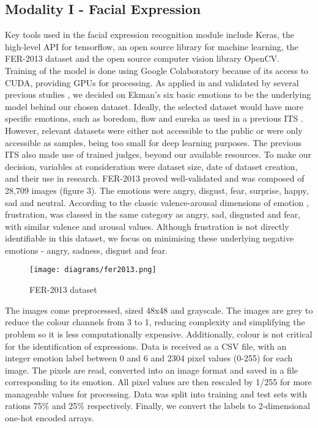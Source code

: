 \documentclass[12pt,a4paper]{article}
\begin{document}
\subsection{Modality I - Facial Expression}
Key tools used in the facial expression recognition module include Keras, the high-level API for tensorflow, an open source library for machine learning, the FER-2013 dataset \cite{giannopoulos2018deep} and the open source computer vision library OpenCV. Training of the model is done using Google Colaboratory because of its access to CUDA, providing GPUs for processing.
As applied in and validated by several previous studies \cite{graesser2005autotutor} \cite{woolf2009affect}, we decided on Ekman's six basic emotions \cite{ekman1992argument} to be the underlying model behind our chosen dataset. Ideally, the selected dataset would have more specific emotions, such as boredom, flow and eureka as used in a previous ITS \cite{barron2012intelligent}. However, relevant datasets were either not accessible to the public or were only accessible as samples, being too small for deep learning purposes. The previous ITS also made use of trained judges, beyond our available resources. To make our decision, variables at consideration were dataset size, date of dataset creation, and their use in research. FER-2013 proved well-validated \cite{giannopoulos2018deep} and was composed of 28,709 images (figure 3). The emotions were angry, disgust, fear, surprise, happy, sad and neutral.  According to the classic valence-arousal dimensions of emotion \cite{hepach2011conceptualizing}, frustration, was classed in the same category as angry, sad, disgusted and fear, with similar valence and arousal values. Although frustration is not directly identifiable in this dataset, we focus on minimising these underlying negative emotions -  angry, sadness, disgust and fear.

\begin{figure}[h]
	\centerline{\texttt{[image: diagrams/fer2013.png]}}
	\caption{FER-2013 dataset}
\end{figure}

The images come preprocessed, sized 48x48 and grayscale. The images are grey to reduce the colour channels from 3 to 1, reducing complexity and simplifying the problem so it is less computationally expensive. Additionally, colour is not critical for the identification of expressions. Data is received as a CSV file, with an integer emotion label between 0 and 6 and 2304 pixel values (0-255) for each image. The pixels are read, converted into an image format and saved in a file corresponding to its emotion. All pixel values are then rescaled by 1/255 for more manageable values for processing. Data was split into training and test sets with rations 75\% and 25\% respectively. Finally, we convert the labels to 2-dimensional one-hot encoded arrays.
\end{document}
